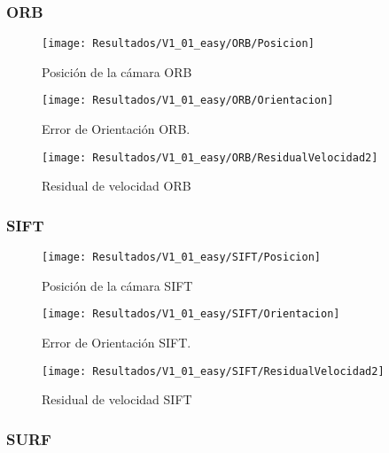 \subsubsection{ORB}


\begin{figure}[H]
	\centering
	\texttt{[image: Resultados/V1\_01\_easy/ORB/Posicion]}
	\caption{Posición de la cámara ORB}
	\label{imagen:Resultados/V1_01_easy/ORB/Posicion}
\end{figure}


\begin{figure}[H]
	\centering
	\texttt{[image: Resultados/V1\_01\_easy/ORB/Orientacion]}
	\caption[Error de Orientación ORB]{Error de Orientación ORB.}
	\label{imagen:Resultados/V1_01_easy/ORB/Orientacion}
\end{figure}
\begin{figure}[H]
	\centering
	\texttt{[image: Resultados/V1\_01\_easy/ORB/ResidualVelocidad2]}
	\caption{Residual de velocidad ORB}
	\label{imagen:Resultados/V1_01_easy/ORB/ResidualVelocidad}
\end{figure}


\subsubsection{SIFT}


\begin{figure}[H]
	\centering
	\texttt{[image: Resultados/V1\_01\_easy/SIFT/Posicion]}
	\caption{Posición de la cámara SIFT}
	\label{imagen:Resultados/V1_01_easy/SIFT/Posicion}
\end{figure}


\begin{figure}[H]
	\centering
	\texttt{[image: Resultados/V1\_01\_easy/SIFT/Orientacion]}
	\caption[Error de Orientación SIFT]{Error de Orientación SIFT.}
	\label{imagen:Resultados/V1_01_easy/SIFT/Orientacion}
\end{figure}



\begin{figure}[H]
	\centering
	\texttt{[image: Resultados/V1\_01\_easy/SIFT/ResidualVelocidad2]}
	\caption{Residual de velocidad SIFT}
	\label{imagen:Resultados/V1_01_easy/SIFT/ResidualVelocidad}
\end{figure}

\subsubsection{SURF}


